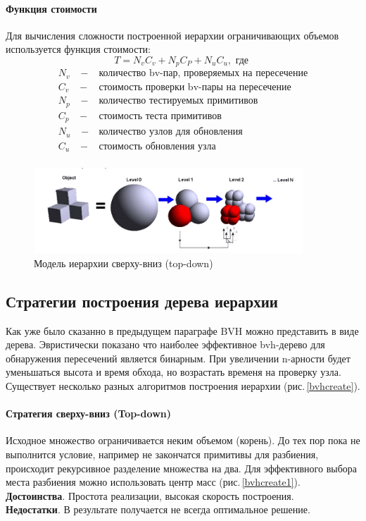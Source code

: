 \documentclass[11pt,a4paper]{extarticle}
\begin{document}
		\paragraph{Функция стоимости}
		Для вычисления сложности построенной иерархии ограничивающих объемов используется функция стоимости:
		\begin{equation*}
			T = N_vC_v + N_pC_P + N_uC_u, \text{ где }
		\end{equation*}
		\begin{equation*}			
			\begin{array}{ll}
				N_v\;\;\;-&\text{количество bv-пар, проверяемых на пересечение}\\
				C_v\;\;\;-&\text{стоимость проверки bv-пары на пересечение}\\
				N_p\;\;\;-&\text{количество тестируемых примитивов}\\
				C_p\;\;\;-&\text{стоимость теста примитивов}\\
				N_u\;\;\;-&\text{количество узлов для обновления}\\
				C_u\;\;\;-&\text{стоимость обновления узла}\\
			\end{array} 
		\end{equation*}
		\begin{figure}[ht]
			\centering
			\includegraphics[width=0.9\textwidth]{bvhmodel}
			\caption{Модель иерархии сверху-вниз (top-down)}
			\label{bvhmodel}
		\end{figure}
		\subsection{Стратегии построения дерева иерархии}
			Как уже было сказанно в предыдущем параграфе BVH можно представить в виде дерева. 
			Эвристически показано что наиболее эффективное bvh-дерево для обнаружения пересечений является бинарным.
			При увеличении n-арности будет уменьшаться высота и время обхода, но возрастать временя на проверку узла.
			Существует несколько разных алгоритмов построения иерархии (рис.\,\ref{bvhcreate}).

			\paragraph{Стратегия сверху-вниз (Top-down)}
			Исходное множество ограничивается неким объемом (корень).
			До тех пор пока не выполнится условие, например не закончатся примитивы для разбиения, происходит рекурсивное разделение множества на два.
			Для эффективного выбора места разбиения можно использовать центр масс (рис.\,\ref{bvhcreate1}).\\
			\textbf{Достоинства}. Простота реализации, высокая скорость построения.\\
			\textbf{Недостатки}. В результате получается не всегда оптимальное решение.
\end{document}
